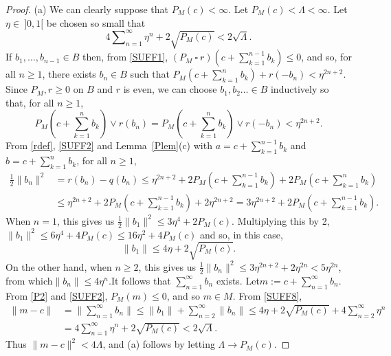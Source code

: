 \documentclass[letterpaper]{article}
\theoremstyle{plain}
\theoremstyle{definition}
\numberwithin{equation}{section}
\newcommand{\half}{{\textstyle\frac{1}{2}}}
\newcommand{\ssquare}{\ \square\ }
\newcommand{\tsum}{\ts\sum}
\newcommand{\sumn}{\sum\nolimits}
\newcommand{\tsumn}{\ts\sumn}
\newcommand{\ts}{\textstyle}
\newcommand{\Lem}{Lemma~\ref}
\begin{document}
%
\begin{proof}(a) We can clearly suppose that  $P_M(c) < \infty$.   Let $P_M(c) < \Lambda < \infty$.   Let $\eta \in\ ]0,1[$ be chosen so small that
%
$$4\tsumn_{n = 1}^\infty \eta^n + 2\sqrt{P_M(c)} < 2\sqrt\Lambda.$$
%
If $b_1, \dots, b_{n - 1}\in B$ then, from \eqref{SUFF1}, $(P_M \ssquare r)(c + \tsum_{k = 1}^{n-1} b_k) \le 0$, and so, for all $n \ge 1$, there exists $b_n \in B$ such that $P_M(c + \tsum_{k = 1}^n b_k) + r(-b_n) < \eta^{2n + 2}$.   Since $P_M, r \ge 0$ on $B$ and $r$ is even, we can choose $b_1,b_2\dots \in B$ inductively so that, for all $n \ge 1$,
%
\begin{equation}\label{SUFF2}
P_M(c + \tsum_{k = 1}^n b_k) \vee r(b_n) = P_M(c + \tsum_{k = 1}^n b_k) \vee r(-b_n) < \eta^{2n + 2}.
\end{equation}
%
From \eqref{rdef}, \eqref{SUFF2} and \Lem{Plem}(c) with $a = c + \tsum_{k = 1}^{n - 1} b_k$ and $b = c + \tsum_{k = 1}^{n} b_k$, for all $n \ge 1$,
%
\begin{align*}
\half\|b_n\|^2 &= r(b_n) - q(b_n)
\le \eta^{2n + 2} + 2P_M(c + \tsum_{k = 1}^{n - 1} b_k) + 2P_M(c + \tsum_{k = 1}^n b_k)\\
&\le \eta^{2n + 2} + 2P_M(c + \tsum_{k = 1}^{n - 1} b_k) + 2\eta^{2n + 2} = 3\eta^{2n + 2} + 2P_M(c + \tsum_{k = 1}^{n - 1} b_k).
\end{align*}
%   
When $n = 1$, this gives us $\half\|b_{1}\|^2 \le  3\eta^{4} + 2P_M(c)$.   Multiplying this by 2,
$\|b_1\|^2 \le  6\eta^{4} + 4P_M(c) \le  16\eta^{2} + 4P_M(c)$ and so, in this case,
\begin{equation}\label{SUFF8}
\|b_{1}\| \le  4\eta + 2\sqrt{P_M(c)}.
\end{equation}
%
On the other hand, when $n \ge 2$, this gives us $\half\|b_{n}\|^2 \le  3\eta^{2n + 2} + 2\eta^{2n} < 5\eta^{2n}$, from which\quad $\|b_n\| \le 4\eta^{n}$.\quad  It follows that $\tsum_{n = 1}^\infty b_n$ exists.   Let\break  $m := c + \sum_{n = 1}^\infty b_n$.  From \eqref{P2} and \eqref{SUFF2}, $P_M(m) \le 0$, and so $m \in M$.  From \eqref{SUFF8},
%
\begin{align*}
\|m - c\| &= \|\tsum_{n = 1}^\infty b_n\| \le \|b_1\| + \tsum_{n = 2}^\infty\|b_n\|  \le  4\eta + 2\sqrt{P_M(c)} + 4\tsum_{n = 2}^\infty\eta^n\\
&= 4\tsum_{n = 1}^\infty \eta^n + 2\sqrt{P_M(c)} < 2\sqrt\Lambda.
\end{align*}
%
Thus $\|m - c\|^2 < 4\Lambda$, and (a) follows by letting $\Lambda \to P_M(c)$.
\par

\end{proof}
\end{document}
